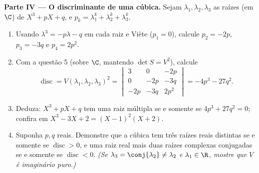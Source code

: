 \begin{problem}
\medskip
\noindent\textbf{Parte IV --- O discriminante de uma cúbica.} Sejam
$\lambda_1, \lambda_2, \lambda_3$ as raízes (em $\C$) de $X^3
+ pX + q$, e $p_k = \lambda_1^k + \lambda_2^k + \lambda_3^k$.
\begin{enumerate}[resume]
  \item Usando $\lambda^3 = -p\lambda - q$ em cada raiz e Viète ($p_1 = 0$), calcule
        $p_2 = -2p$, $p_3 = -3q$ e $p_4 = 2p^2$.
  \item Com a questão 5 (sobre $\C$, mantendo $\det S = V^2$), calcule
        \[
        \operatorname{disc} = V(\lambda_1, \lambda_2,
        \lambda_3)^2 = \begin{vmatrix}
        3 & 0 & -2p\\
        0 & -2p & -3q\\
        -2p & -3q & 2p^2
        \end{vmatrix}
        = -4p^3 - 27q^2 .
        \]
  \item Deduza: $X^3 + pX + q$ tem uma raiz múltipla se e somente se $4p^3 + 27q^2 = 0$;
        confira em $X^3 - 3X + 2 = (X -
        1)^2(X + 2)$.
  \item Suponha $p, q$ reais. Demonstre que a cúbica tem três raízes
        reais distintas se e somente se $\operatorname{disc}
        > 0$, e uma raiz real mais
        duas raízes complexas conjugadas se e somente se $\operatorname{disc} < 0$.
        \emph{(Se $\lambda_3 = \conj{\lambda_2} \neq \lambda_2$ e $\lambda_1 \in \R$, mostre que $V$ é imaginário puro.)}
\end{enumerate}


\end{problem}
